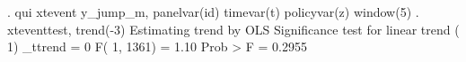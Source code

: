 . qui xtevent y_jump_m, panelvar(id) timevar(t) policyvar(z) window(5)
{\smallskip}
. xteventtest, trend(-3)
{\smallskip}
Estimating trend by OLS
{\smallskip}
Significance test for linear trend
{\smallskip}
 ( 1)  _ttrend = 0
{\smallskip}
       F(  1,  1361) =    1.10
            Prob > F =    0.2955
{\smallskip}
